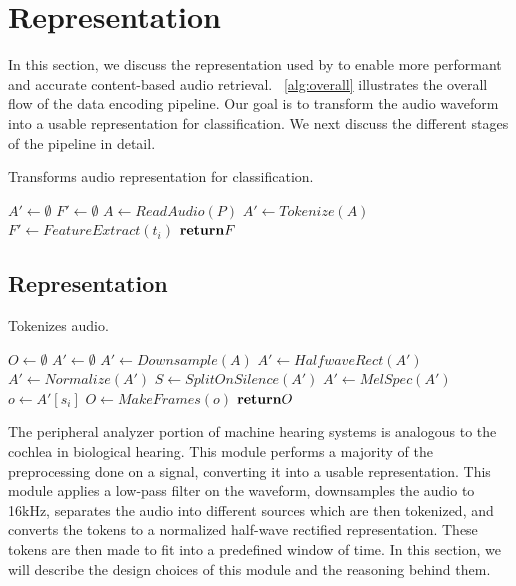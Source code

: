 \section{Representation}

In this section, we discuss the representation used by \sys to enable more
performant and accurate content-based audio retrieval.
%
~\cref{alg:overall} illustrates the overall flow of the data encoding pipeline.
%
Our goal is to transform the audio waveform into a usable representation for
classification.
%
We next discuss the different stages of the pipeline in detail.

\begin{algorithm}[t!]
    \caption{Transforms audio representation for classification.}
	\label{alg:overall}
    \SetAlgoLined
    
     {
        $A' \gets \emptyset$\;
        $F' \gets \emptyset$\;
        $A \gets ReadAudio(P)$\;
        $A' \gets Tokenize(A)$\;
         {
            $F' \gets FeatureExtract(t_i)$\;
        }
        $\Return F$\;
    }
\end{algorithm}

\subsection{Representation}

\begin{algorithm}[b]
    \caption{Tokenizes audio.}\label{encoder}
    \SetAlgoLined
    
     {
        $O \gets \emptyset$\;
        $A' \gets \emptyset$\;
        $A' \gets Downsample(A)$\;
        $A' \gets HalfwaveRect(A')$\;
        $A' \gets Normalize(A')$\;
        $S \gets SplitOnSilence(A')$\;
        $A' \gets MelSpec(A')$\;
         {
            $o \gets A'[s_i]$\;
            $O \gets MakeFrames(o)$\;
        }
        $\Return O$\;
    }
\end{algorithm}

The peripheral analyzer portion of machine hearing systems is analogous to the cochlea in biological hearing. This module performs a majority of the preprocessing done on a signal, converting it into a usable representation. This module applies a low-pass filter on the waveform, downsamples the audio to 16kHz, separates the audio into different sources which are then tokenized, and converts the tokens to a normalized half-wave rectified representation. These tokens are then made to fit into a predefined window of time. In this section, we will describe the design choices of this module and the reasoning behind them.

